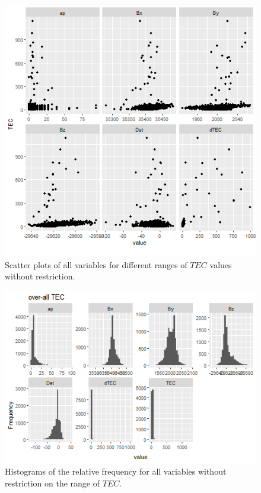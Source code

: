 \documentclass[sn-mathphys-num]{sn-jnl}%
\begin{document}
\begin{figure}
    \centering
    \includegraphics[width=0.9\linewidth]{dataset2scatterplot.png}
    \caption{Scatter plots of all variables for different ranges of $TEC$ values without restriction.}
    \label{fig:dataset2scatterplot}
\end{figure}

\begin{figure}
    \centering
    \includegraphics[width=0.9\linewidth]{allTEC_fix.png}
    \caption{Histograms of the relative frequency for all variables without restriction on the range of $TEC$.}
    \label{fig:allTEC}
\end{figure}
\end{document}
